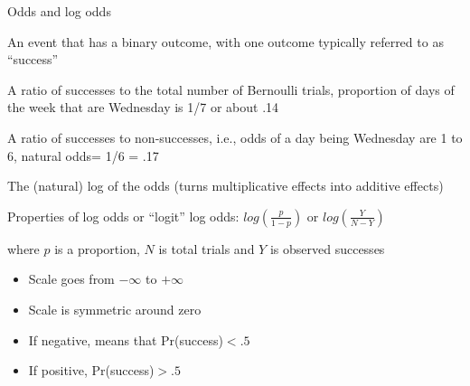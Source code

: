 \documentclass[presentation]{beamer}
\begin{document}
\begin{frame}[label={sec:org9515f98}]{Odds and log odds}
\begin{description}

\item[Bernoulli trial] An event that has a binary outcome, with one
  outcome typically referred to as ``success''

\item[proportion] A ratio of successes to the total number of
  Bernoulli trials, proportion of days of the week that are Wednesday
  is 1/7 or about .14

\item[odds] A ratio of successes to non-successes, i.e., odds of a
  day being Wednesday are 1 to 6, natural odds= 1/6 = .17

\item[log odds] The (natural) log of the odds (turns multiplicative
  effects into additive effects)

\end{description}
\end{frame}

\begin{frame}[label={sec:org937ac70}]{Properties of log odds or ``logit''}
log odds: \(log\left(\frac{p}{1-p}\right)\) or \(log\left(\frac{Y}{N-Y}\right)\)

where \(p\) is a proportion, \(N\) is total trials and \(Y\) is observed successes

\begin{itemize}
\item Scale goes from \(-\infty\) to \(+\infty\)
\item Scale is symmetric around zero
\item If negative, means that Pr(success)\(<.5\)
\item If positive, Pr(success)\(>.5\)
\end{itemize}
\end{frame}
\end{document}
